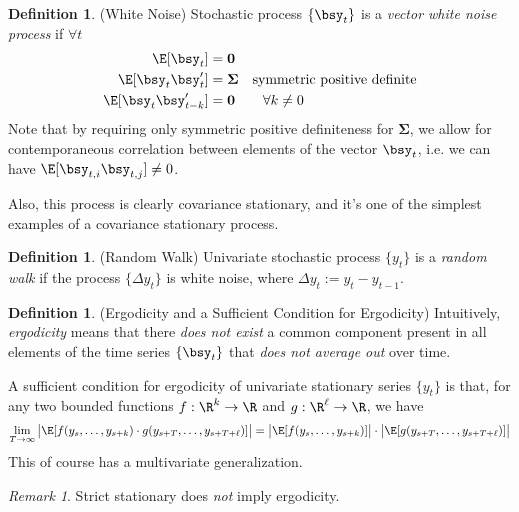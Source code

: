 \documentclass[12pt]{article}
\theoremstyle{plain}
\theoremstyle{definition}
\newtheorem{defn}[thm]{Definition}
\theoremstyle{remark}
\newtheorem*{rmk}{Remark}
\newcommand{\ra}{\rightarrow}
\newcommand{\bsSigma}{\boldsymbol{\Sigma}}
\renewcommand{\bso}{\boldsymbol{0}}
\begin{document}
\begin{defn}(White Noise)
Stochastic process $\{\bsy_t\}$ is a \emph{vector white noise process}
if $\forall t$
\begin{align*}
  \E[\bsy_t] &= \bso
  \\
  \E[\bsy_t\bsy_t'] &= \bsSigma
  \quad\text{symmetric positive definite}
  \\
  \E[\bsy_t\bsy_{t-k}']
  &= \bso \qquad \forall k\neq 0
\end{align*}
Note that by requiring only symmetric positive definiteness for
$\bsSigma$, we allow for contemporaneous correlation between elements of
the vector $\bsy_t$, i.e. we can have $\E[\bsy_{t,i}\bsy_{t,j}]\neq 0$.

Also, this process is clearly covariance stationary, and it's one of the
simplest examples of a covariance stationary process.
\end{defn}

\begin{defn}(Random Walk)
Univariate stochastic process $\{y_t\}$ is a \emph{random walk} if the
process $\{\Delta y_t\}$ is white noise, where
$\Delta y_t := y_t-y_{t-1}$.
\end{defn}

\begin{defn}(Ergodicity and a Sufficient Condition for Ergodicity)
Intuitively, \emph{ergodicity} means that there \emph{does not exist} a
common component present in all elements of the time series $\{\bsy_t\}$
that \emph{does not average out} over time.

A sufficient condition for ergodicity of univariate stationary series
$\{y_t\}$ is that, for any two bounded functions $f:\R^k\ra \R$ and
$g:\R^\ell\ra\R$, we have
\begin{align*}
  \lim_{T\ra\infty}
  \big|
  \E[
    f(y_s,\ldots,y_{s+k})
    \cdot
    g(y_{s+T},\ldots,y_{s+T+\ell})
  ]
  \big|
  =
  \big|
  \E[
    f(y_s,\ldots,y_{s+k})
  ]\big|
    \cdot
  \big|
  \E[
  g(y_{s+T},\ldots,y_{s+T+\ell})]
  \big|
\end{align*}
This of course has a multivariate generalization.
\end{defn}
\begin{rmk}
Strict stationary does \emph{not} imply ergodicity.
\end{rmk}
\end{document}
